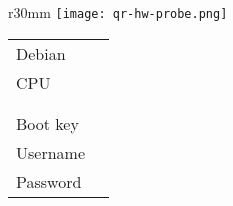 \documentclass[10pt]{article}
\begin{document}
\begin{wrapfigure}{r}{30mm}
	  \texttt{[image: qr-hw-probe.png]}
\end{wrapfigure}

\noindent{}\begin{tabular}{ l | l }
	Debian & \debianversion \\
	CPU & \cpumodel \\
	\disktype & \disksize \\
	\memtype & \memsize \\
	Boot key & \bootmenukey \\
	Username & \username \\
	Password & \password \\
\end{tabular}  
\end{document}
